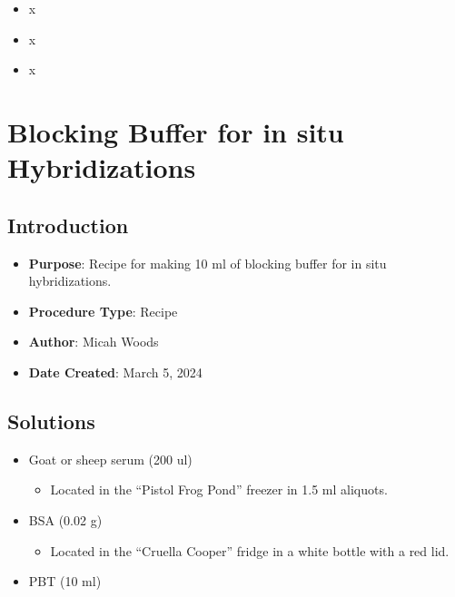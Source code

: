 \documentclass[
  letterpaper,
  DIV=11,
  numbers=noendperiod]{scrreprt}
\providecommand{\tightlist}{%
  \setlength{\itemsep}{0pt}\setlength{\parskip}{0pt}}\usepackage{longtable,booktabs,array}
\begin{document}
\begin{itemize}
\tightlist
\item
  x
\item
  x
\item
  x
\end{itemize}

\hypertarget{sec-recipe-blocking_buffer}{%
\chapter{Blocking Buffer for in situ
Hybridizations}\label{sec-recipe-blocking_buffer}}

\hypertarget{introduction-105}{%
\section{Introduction}\label{introduction-105}}

\begin{itemize}
\tightlist
\item
  \textbf{Purpose}: Recipe for making 10 ml of blocking buffer for in
  situ hybridizations.
\item
  \textbf{Procedure Type}: Recipe
\item
  \textbf{Author}: Micah Woods
\item
  \textbf{Date Created}: March 5, 2024
\end{itemize}

\hypertarget{solutions-91}{%
\section{Solutions}\label{solutions-91}}

\begin{itemize}
\tightlist
\item
  Goat or sheep serum (200 ul)

  \begin{itemize}
  \tightlist
  \item
    Located in the ``Pistol Frog Pond'' freezer in 1.5 ml aliquots.
  \end{itemize}
\item
  BSA (0.02 g)

  \begin{itemize}
  \tightlist
  \item
    Located in the ``Cruella Cooper'' fridge in a white bottle with a
    red lid.
  \end{itemize}
\item
  PBT (10 ml)
\end{itemize}
\end{document}
